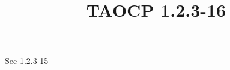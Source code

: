 \documentclass{article}
\title{TAOCP 1.2.3\mbox{-}16}
\begin{document}
\maketitle

See \href{./1.2.3-15.pdf}{1.2.3\mbox{-}15}
\end{document}
